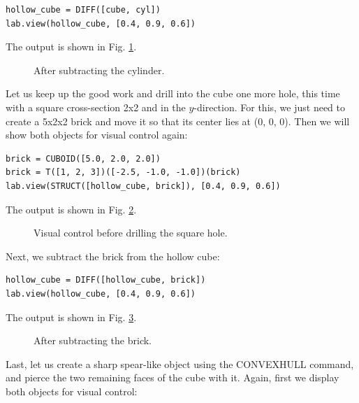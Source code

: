 \documentclass[article,A4,12pt]{llncs}
\begin{document}
\begin{verbatim}
hollow_cube = DIFF([cube, cyl])
lab.view(hollow_cube, [0.4, 0.9, 0.6])
\end{verbatim}
The output is shown in Fig. \ref{fig:diff-2}.
\newpage

\begin{figure}[!ht]
\begin{center}
\end{center}
\vspace{-2mm}
\caption{After subtracting the cylinder.}
\label{fig:diff-2}
\end{figure}
\noindent
Let us keep up the good work and drill into the cube one more hole,
this time with a square cross-section
2x2 and in the $y$-direction. For this, we just need to create a 5x2x2 brick
and move it so that its center lies at (0, 0, 0). Then we will show 
both objects for visual control again:

\begin{verbatim}
brick = CUBOID([5.0, 2.0, 2.0])
brick = T([1, 2, 3])([-2.5, -1.0, -1.0])(brick)
lab.view(STRUCT([hollow_cube, brick]), [0.4, 0.9, 0.6])
\end{verbatim}
The output is shown in Fig. \ref{fig:diff-3}.
\newpage

\begin{figure}[!ht]
\begin{center}
\end{center}
\vspace{-2mm}
\caption{Visual control before drilling the square hole.}
\label{fig:diff-3}
\end{figure}
\noindent
Next, we subtract the brick from the hollow cube:

\begin{verbatim}
hollow_cube = DIFF([hollow_cube, brick])
lab.view(hollow_cube, [0.4, 0.9, 0.6])
\end{verbatim}
The output is shown in Fig. \ref{fig:diff-4}.
\newpage

\begin{figure}[!ht]
\begin{center}
\end{center}
\vspace{-2mm}
\caption{After subtracting the brick.}
\label{fig:diff-4}
\end{figure}
\noindent
Last, let us create a sharp spear-like object using the 
CONVEXHULL command, and pierce the two remaining faces 
of the cube with it. Again, first we display both objects 
for visual control:
\end{document}
